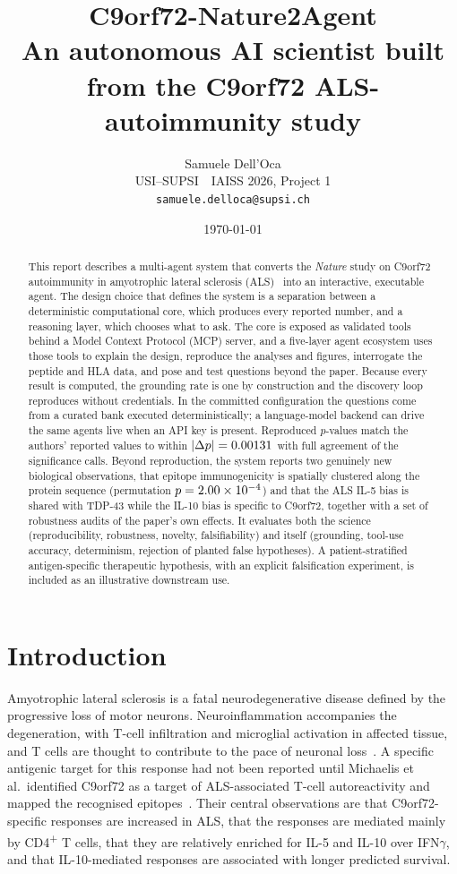 \documentclass[11pt]{article}
\title{\textbf{C9orf72-Nature2Agent}\\[0.3em]
\large An autonomous AI scientist built from the C9orf72 ALS-autoimmunity study}
\author{Samuele Dell'Oca\\\small USI--SUPSI \,\textbar\, IAISS 2026, Project 1\\\small \texttt{samuele.delloca@supsi.ch}}
\date{\today}
\begin{document}
\maketitle

\begin{abstract}
\noindent
This report describes a multi-agent system that converts the
\emph{Nature} study on C9orf72 autoimmunity in amyotrophic lateral sclerosis (ALS)~\citep{michaelis2025c9orf72} into an
interactive, executable agent. The design choice that defines the system is a separation between a
deterministic computational core, which produces every reported number, and a reasoning layer, which
chooses what to ask. The core is exposed as validated tools behind a Model Context Protocol (MCP)
server, and a five-layer agent ecosystem uses those tools to explain the design, reproduce the
analyses and figures, interrogate the peptide and HLA data, and pose and test questions beyond the
paper. Because every result is computed, the grounding rate is one by construction and the discovery
loop reproduces without credentials. In the committed configuration the questions come from a curated
bank executed deterministically; a language-model backend can drive the same agents live when an API
key is present. Reproduced $p$-values match the authors' reported values to within
$|\Delta p|=0.00131{}$ with full agreement of the significance calls. Beyond reproduction,
the system reports two genuinely new biological observations, that epitope immunogenicity is
spatially clustered along the protein sequence (permutation $p=\num{2.00e-04}{}$) and that the ALS IL-5
bias is shared with TDP-43 while the IL-10 bias is specific to C9orf72, together with a set of
robustness audits of the paper's own effects. It evaluates both the science (reproducibility,
robustness, novelty, falsifiability) and itself (grounding, tool-use accuracy, determinism, rejection
of planted false hypotheses). A patient-stratified antigen-specific therapeutic hypothesis, with an
explicit falsification experiment, is included as an illustrative downstream use.
\end{abstract}

\section{Introduction}
Amyotrophic lateral sclerosis is a fatal neurodegenerative disease defined by the progressive
loss of motor neurons. Neuroinflammation accompanies the degeneration, with T-cell infiltration
and microglial activation in affected tissue, and T cells are thought to contribute to the pace
of neuronal loss~\citep{endo2016,kovacs2021}. A specific antigenic target for this
response had not been reported until Michaelis et al.\ identified C9orf72 as a target of
ALS-associated T-cell autoreactivity and mapped the recognised epitopes~\citep{michaelis2025c9orf72}.
Their central observations are that C9orf72-specific responses are increased in ALS, that the
responses are mediated mainly by CD4\textsuperscript{+} T cells, that they are relatively enriched
for IL-5 and IL-10 over IFN$\gamma$, and that IL-10-mediated responses are associated with longer
predicted survival.
\end{document}
